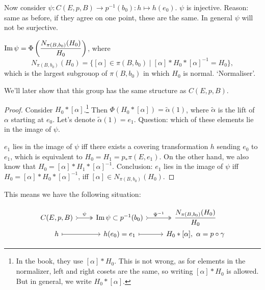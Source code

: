 Now consider $\psi: C(E, p, B) \to  p^{-1}(b_0): h \mapsto h(e_0)$.
$\psi$ is injective. Reason: same as before, if they agree on one point, these are the same.
In general $\psi$ will not be surjective.

\begin{lemma}
    $\operatorname{Im} \psi = \Phi\left( \dfrac{N_{\pi(B,b_0)} (H_0)}{H_0} \right) $, where
    \[
        N_{\pi(B,b_0) }(H_0) = \{[\alpha] \in \pi(B,b_0)  \mid [\alpha] * H_0 * [\alpha]^{-1} = H_0\},
    \] 
    which is the largest subgrouop of $\pi(B,b_0) $ in which $H_0$ is normal. `Normaliser'.
\end{lemma}

We'll later show that this group has the same structure as $C(E, p, B)$.

\begin{proof}
    Consider $H_0 * [\alpha]$.\footnote{In the book, they use $[\alpha] * H_0$. This is not wrong, as for elements in the normalizer, left and right cosets are the same, so writing $[\alpha] * H_0$ is allowed. But in general, we write $H_0 * [\alpha]$.}
    Then $\Phi(H_0 * [\alpha]) = \tilde{\alpha}(1)$, where $\tilde{\alpha}$ is the lift of $\alpha$ starting at $e_0$. Let's denote $\tilde{\alpha}(1) = e_1$.
    Question: which of these elements lie in the image of $\psi$.

    $e_1$ lies in the image of $\psi$ iff there exists a covering transformation $h$ sending $e_0$ to $e_1$, which is equivalent to $H_0 = H_1 = p_* \pi(E,e_1)$.
    On the other hand, we also know that $H_0 = [\alpha] * H_1 * [\alpha]^{-1}$.
    Conclusion: $e_1$ lies in the image of $\psi$ iff $H_0 = [\alpha] * H_0 * [\alpha]^{-1}$, iff $[\alpha] \in N_{\pi(B,b_0) }(H_0)$.
\end{proof}

This means we have the following situation:

\[
    \begin{tikzcd}[row sep=0em]
        C(E, p, B) \arrow[r, twoheadrightarrow, tail, "\psi"] &\im \psi \subset p^{-1}(b_0) \arrow[r, twoheadrightarrow, tail, "\Psi^{-1}"] &\dfrac{N_{\pi(B,b_0) }(H_0)}{H_0}\\
        h \arrow[r, mapsto, ""] & h(e_0) = e_1\arrow[r, mapsto, ""] &H_0 * [\alpha], \ \alpha = p  \circ  \gamma
    \end{tikzcd}
\]

